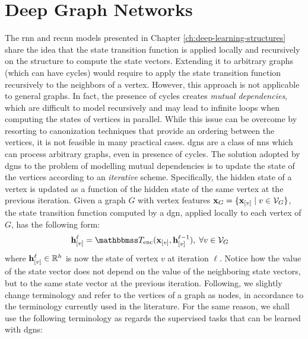 \chapter{Deep Graph Networks} \label{ch:dgn} 

The \gls{rnn} and \gls{recnn} models presented in Chapter \ref{ch:deep-learning-structures} share the idea that the state transition function is applied locally and recursively on the structure to compute the state vectors. Extending it to arbitrary graphs (which can have cycles) would require to apply the state transition function recursively to the neighbors of a vertex. However, this approach is not applicable to general graphs. In fact, the presence of cycles creates \emph{mutual dependencies}, which are difficult to model recursively and may lead to infinite loops when computing the states of vertices in parallel. While this issue can be overcome by resorting to canonization techniques that provide an ordering between the vertices, it is not feasible in many practical cases. \glspl{dgn} are a class of \glspl{nn} which can process arbitrary graphs, even in presence of cycles. The solution adopted by \glspl{dgn} to the problem of modelling mutual dependencies is to update the state of the vertices according to an \emph{iterative} scheme. Specifically, the hidden state of a vertex is updated as a function of the hidden state of the same vertex at the previous iteration. Given a graph $G$ with vertex features $\Vector{X}_G = \Set{\Elem{x}{v} \mid v \in \Cal{V}_G}$, the state transition function computed by a \gls{dgn}, applied locally to each vertex of $G$, has the following form:
\begin{align*}
    \Elem{h}{v}^{\ell} &= \Transduction_{\Fun{enc}}(\Elem{x}{v}, \Elem{h}{v}^{\ell-1}), \; \forall v \in \Cal{v}_G
\end{align*}
where $\Elem{h}{v}^{\ell} \in \Real^h$ is now the state of vertex $v$ at iteration $\ell$. Notice how the value of the state vector does not depend on the value of the neighboring state vectors, but to the same state vector at the previous iteration. Following, we slightly change terminology and refer to the vertices of a graph as nodes, in accordance to the terminology currently used in the literature. For the same reason, we shall use the following terminology as regards the supervised tasks that can be learned with \glspl{dgn}:
